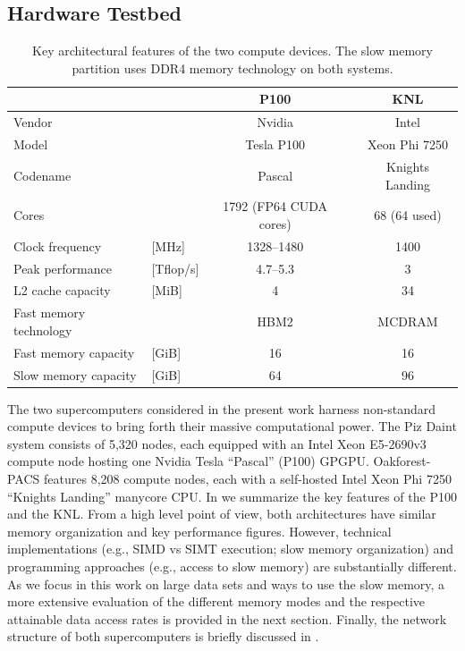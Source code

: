 \documentclass[letterpaper]{llncs}
\newcommand{\OFP}{Oakforest-PACS\xspace}
\newcommand{\second}{\mbox{s}\xspace}
\newcommand{\flop}{\mbox{flop}\xspace}
\newcommand{\TFS}{\mbox{T\flop/\second}\xspace}
\newcommand{\MHZ}{\mbox{MHz}\xspace}
\newcommand{\GiB}{\mbox{GiB}\xspace}
\newcommand{\MiB}{\mbox{MiB}\xspace}
\begin{document}
\subsection{Hardware Testbed} \label{sect:Hardware}

\begin{table}[t]
    \centering
    \begin{tabular}{llccc}
        & & \textbf{P100} & & \textbf{KNL} \\
        \hline
        Vendor & & Nvidia & & Intel \\
        Model & & Tesla P100 & & Xeon Phi 7250 \\
        Codename & & Pascal & & Knights Landing \\
        Cores & & 1792 (FP64 CUDA cores) & & 68 (64 used) \\
        Clock frequency & [\MHZ{}] & 1328--1480 & & 1400 \\
        Peak performance & [\TFS{}] & 4.7--5.3 & & 3 \\
        L2 cache capacity & [\MiB{}] & 4 & & 34 \\
        Fast memory technology & & HBM2 & & MCDRAM \\
        Fast memory capacity & [\GiB{}] & 16 & & 16 \\
        Slow memory capacity & [\GiB{}] & 64 & & 96 \\
    \end{tabular}\smallskip
    \caption{Key architectural features of the two compute
      devices. The slow memory partition uses DDR4 memory technology on
      both systems.}
    \label{tab:arch}
\end{table}
The two supercomputers considered in the present work harness non-standard
compute devices to bring forth their massive computational power. The Piz
Daint system consists of 5,320 nodes, each equipped with an Intel Xeon
E5-2690v3 compute node hosting one Nvidia Tesla ``Pascal''
(P100) GPGPU. \OFP features 8,208 compute nodes, each with a self-hosted
Intel Xeon Phi 7250 ``Knights Landing'' manycore CPU.
In  we summarize the key features of the
P100 and the KNL.
From a high level point of view, both architectures have similar memory
organization and key performance figures. However, technical
implementations (e.g., SIMD vs SIMT execution; slow memory organization)
and programming approaches (e.g., access to slow memory) are
substantially different. As we focus in this work on large data sets
and ways to use the slow memory, a more extensive evaluation of the
different memory modes and the respective attainable data access rates
is provided in the next section. Finally, the network structure of both
supercomputers is briefly discussed in .
\end{document}
